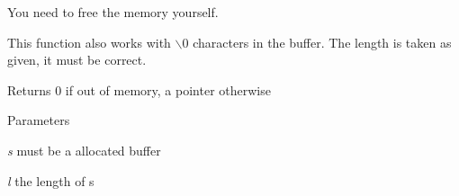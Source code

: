 You need to free the memory yourself.

This function also works with $\backslash$0 characters in the buffer. The length is taken as given, it must be correct.

\begin{DoxyReturn}{Returns}
0 if out of memory, a pointer otherwise 
\end{DoxyReturn}

\begin{DoxyParams}{Parameters}
\item[{\em s}]must be a allocated buffer \item[{\em l}]the length of s \end{DoxyParams}
